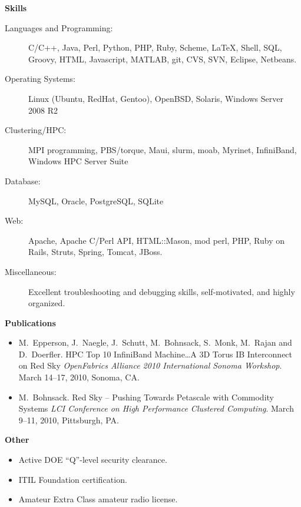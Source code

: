 \documentclass[letterpaper,10pt]{article}
\newcommand{\resheading}[1]{{\large{\colorbox{MyGrey}{\textbf{\fontfamily{phv}\selectfont #1 \vphantom{p\^{E}}}}}}}
\begin{document}

\resheading{Skills}
\begin{description}
\item[Languages and Programming:] C/C++, Java, Perl, Python, PHP, Ruby, Scheme, \LaTeX, Shell, SQL, Groovy, HTML, Javascript, MATLAB, git, CVS, SVN, Eclipse, Netbeans.
\item[Operating Systems:] Linux (Ubuntu, RedHat, Gentoo), OpenBSD, Solaris, Windows Server 2008 R2
\item[Clustering/HPC:] MPI programming, PBS/torque, Maui, slurm, moab, Myrinet, InfiniBand, Windows HPC Server Suite
\item[Database:] MySQL, Oracle, PostgreSQL, SQLite
\item[Web:] Apache, Apache C/Perl API, HTML::Mason, mod perl, PHP, Ruby on Rails, Struts, Spring, Tomcat, JBoss.
\item[Miscellaneous:] Excellent troubleshooting and debugging skills, self-motivated, and highly organized.
\end{description}

\resheading{Publications}
\begin{itemize}
    \item M.~Epperson, J.~Naegle, J.~Schutt, M.~Bohnsack, S.~Monk, M.~Rajan and D.~Doerfler.  HPC Top 10 InfiniBand Machine\ldots A 3D Torus IB Interconnect on Red Sky {\sl OpenFabrics Alliance 2010 International Sonoma Workshop}.  March 14--17, 2010, Sonoma, CA.
    \item M.~Bohnsack. Red Sky -- Pushing Towards Petascale with Commodity Systems {\sl LCI Conference on High Performance Clustered Computing}.  March 9--11, 2010, Pittsburgh, PA.
\end{itemize}

\resheading{Other}
\begin{itemize}
    \item Active DOE ``Q''-level security clearance.
    \item ITIL Foundation certification.
    \item Amateur Extra Class amateur radio license.
\end{itemize}
\end{document}
